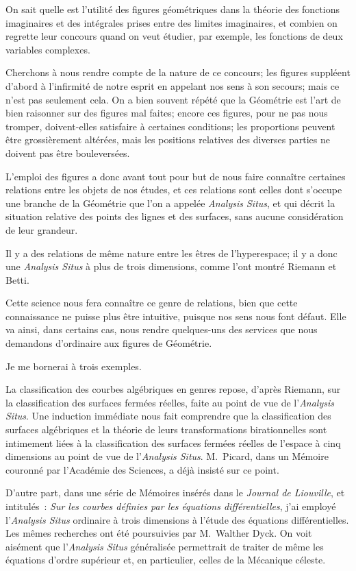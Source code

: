 \documentclass{article}
\begin{document}
On sait quelle est l'utilité des figures géométriques dans la théorie des fonctions imaginaires et des intégrales prises entre des limites imaginaires, et combien on regrette leur concours quand on veut étudier, par exemple, les fonctions de deux variables complexes.

Cherchons à nous rendre compte de la nature de ce concours; les figures suppléent d'abord à l'infirmité de notre esprit en appelant nos sens à son secours; mais ce n'est pas seulement cela. On a bien souvent répété que la Géométrie est l'art de bien raisonner sur des figures mal faites; encore ces figures, pour ne pas nous tromper, doivent-elles satisfaire à certaines conditions; les proportions peuvent être grossièrement altérées, mais les positions relatives des diverses parties ne doivent pas être bouleversées.

L'emploi des figures a donc avant tout pour but de nous faire connaître certaines relations entre les objets de nos études, et ces relations sont celles dont s'occupe une branche de la Géométrie que l'on a appelée \emph{Analysis Situs}, et qui décrit la situation relative des points des lignes et des surfaces, sans aucune considération de leur grandeur.

Il y a des relations de même nature entre les êtres de l'hyperespace; il y a donc une \emph{Analysis Situs} à plus de trois dimensions, comme l'ont montré Riemann et Betti.

Cette science nous fera connaître ce genre de relations, bien que cette connaissance ne puisse plus être intuitive, puisque nos sens nous font
défaut. Elle va ainsi, dans certains cas, nous rendre quelques-uns des services que nous demandons d'ordinaire aux figures de Géométrie.

Je me bornerai à trois exemples.

La classification des courbes algébriques en genres repose, d'après Riemann, sur la classification des surfaces fermées réelles, faite au point de vue de l'\emph{Analysis Situs}. Une induction immédiate nous fait comprendre que la classification des surfaces algébriques et la théorie de leurs transformations birationnelles sont intimement liées à la classification des surfaces fermées réelles de l'espace à cinq dimensions au point de vue de l'\emph{Analysis Situs}. M.~Picard, dans un Mémoire couronné par l'Académie des Sciences, a déjà insisté sur ce point.

D'autre part, dans une série de Mémoires insérés dans le \emph{Journal de Liouville}, et intitulés~: \emph{Sur les courbes définies par les équations différentielles}, j'ai employé l'\emph{Analysis Situs} ordinaire à trois dimensions à l'étude des équations différentielles. Les mêmes recherches ont été poursuivies par M.~Walther Dyck. On voit aisément que l'\emph{Analysis Situs} généralisée permettrait de traiter de même les équations d'ordre supérieur et, en particulier, celles de la Mécanique céleste.
\end{document}
